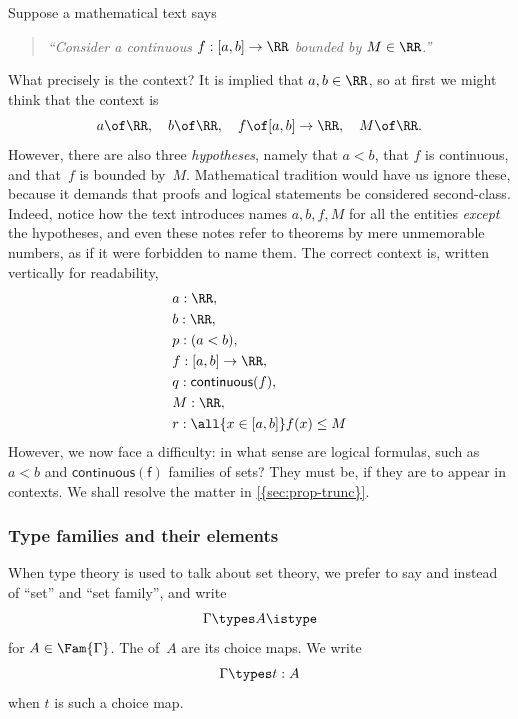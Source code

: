 \begin{example}
  \label{example:context}
  Suppose a mathematical text says
  \begin{quote}
    \emph{``Consider a continuous $f : [a, b] \to \RR$ bounded by $M \in \RR$.''}
  \end{quote}
  What precisely is the context? It is implied that $a, b \in \RR$, so at first we might think that the context is
  \begin{equation*}
    a \of \RR, \quad
    b \of \RR, \quad
    f \of [a, b] \to \RR, \quad
    M \of \RR.
  \end{equation*}
  However, there are also three \emph{hypotheses}, namely that $a < b$, that $f$ is continuous, and that~$f$ is bounded by~$M$.
  Mathematical tradition would have us ignore these, because it demands that proofs and logical statements be considered second-class. Indeed, notice how the text introduces names $a, b, f, M$ for all the entities \emph{except} the hypotheses, and even these notes refer to theorems by mere unmemorable numbers, as if it were forbidden to name them.
  The correct context is, written vertically for readability,
  \begin{align*}
    & a : \RR, \\
    & b : \RR, \\
    & p : (a < b), \\
    & f : [a, b] \to \RR, \\
    & q : \mathsf{continuous}(f), \\
    & M : \RR, \\
    & r : \all{x \in [a,b]} f(x) \leq M
  \end{align*}
  However, we now face a difficulty: in what sense are logical formulas, such as $a < b$ and $\mathsf{continuous(f)}$ families of sets? They must be, if they are to appear in contexts. We shall resolve the matter in \cref{{sec:prop-trunc}}.
\end{example}

\subsubsection{Type families and their elements}
\label{sec:type-families}

When type theory is used to talk about set theory, we prefer to say  and  instead of ``set'' and ``set family'', and write
%
\begin{equation*}
  \Gamma \types A \istype
\end{equation*}
%
for $A \in \Fam{\Gamma}$.
%
The  of~$A$ are its choice maps. We write
%
\begin{equation*}
  \Gamma \types t : A
\end{equation*}
%
when $t$ is such a choice map.

